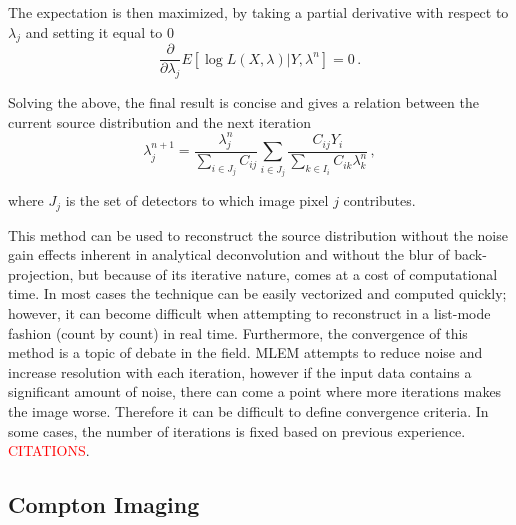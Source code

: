 \documentclass[10pt]{article}
\begin{document}
\noindent The expectation is then maximized, by taking a partial derivative with respect to $\lambda_j$ and setting it equal to 0
 \begin{equation}
	\frac{\partial}{\partial \lambda_j} E[\log L(X,\lambda) | Y,\lambda^n] = 0\,.
\end{equation}

\noindent Solving the above, the final result is concise and gives a relation between the current source distribution and the next iteration
%
 \begin{equation}
	\lambda_j^{n+1} = \frac{\lambda_j^n}{\sum\limits_{i \in J_j}C_{ij}} \sum_{i \in J_j} \frac{C_{ij}Y_i}{\sum\limits_{k \in I_i}C_{ik}\lambda_k^n}\,,
\end{equation}

\noindent where $J_j$ is the set of detectors to which image pixel $j$ contributes.

This method can be used to reconstruct the source distribution without the noise gain effects inherent in analytical deconvolution and without the blur of back-projection, but because of its iterative nature, comes at a cost of computational time. In most cases the technique can be easily vectorized and computed quickly; however, it can become difficult when attempting to reconstruct in a list-mode fashion (count by count) in real time. Furthermore, the convergence of this method is a topic of debate in the field. MLEM attempts to reduce noise and increase resolution with each iteration, however if the input data contains a significant amount of noise, there can come a point where more iterations makes the image worse. Therefore it can be difficult to define convergence criteria. In some cases, the number of iterations is fixed based on previous experience. \textcolor{red}{CITATIONS}.



\subsection{Compton Imaging}
\end{document}
